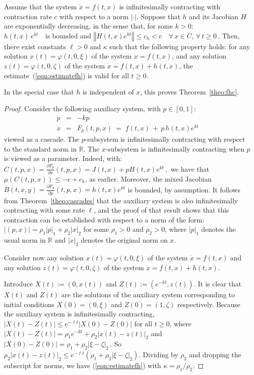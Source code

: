 \documentclass{svmult}
\newcommand{\opteqn}[1]{$#1$}
\newcommand{\R}{{\mathbb R}}  %
\newcommand{\abs}[1]{\left\vert #1 \right\vert}
\newcommand{\norm}[1]{\left\Vert #1 \right\Vert}
\newcommand{\beqn}{\begin{eqnarray*}}
\newcommand{\eeqn}{\end{eqnarray*}}
\newcommand{\cc}{c}
\newcommand{\norma}{1}
\newcommand{\normb}{2}
\newcommand{\absv}[1]{\left\vert #1 \right\vert}
\begin{document}
\begin{lemma}
\label{lem:fh}
Assume that the system $\dot x=f(t,x)$ is infinitesimally contracting with
contraction rate $\cc$ with respect to a norm $\absv{\cdot }$.
Suppose that $h$ and its Jacobian $H$ are exponentially decreasing, in the
sense that, for some $k>0$:
\opteqn{
h(t,x)\,e^{kt} \quad \mbox{is bounded}
}
and
\opteqn{
\norm{H(t,x)e^{kt}} \leq  c_h < c\quad
\forall \,x \in C, \, \forall \, t\geq 0\,.
}
Then, there exist constants $\ell>0$ and $\kappa $ such that the following property
holds:
for any solution $x(t)=\varphi(t,0,\xi )$ of the system $\dot x=f(t,x)$,
and any solution $z(t)=\varphi(t,0,\zeta )$ of the system $\dot x=f(t,x)+h(t,x)$,
the estimate~(\ref{eqn:estimatefh}) is valid for all $t\geq 0$.
\end{lemma}

In the special case that $h$ is independent of $x$, this
proves Theorem~\ref{theo:fhc}.

\begin{proof}
Consider the following auxiliary system, with $p\in [0,1]$:
\beqn
\dot p &=& -kp\\
\dot x &=& F_p(t,p,x) \;=\; f(t,x) \,+\, p\, h(t,x)e^{kt}
\eeqn
viewed as a cascade.
The $p$-subsystem is infinitesimally contracting
with respect to the standard norm in $\R$.
The $x$-subsystem is infinitesimally contracting
when $p$ is viewed as a parameter.  Indeed, with:
\opteqn{
C(t,p,x) = \frac{\partial F_p}{\partial x}(t,p,x) = J(t,x)+ pH(t,x)e^{kt} \,,
}
we have that $\mu (C(t,p,x)) \leq  -c+c_h$, as earlier.
Moreover, the mixed Jacobian
\opteqn{
B(t,x,y) = \frac{\partial F_p}{\partial p}(t,p,x) = h(t,x)e^{kt}
}
is bounded, by assumption.
It follows from Theorem~\ref{theo:cascades} that the auxiliary system is also
infinitesimally contracting with some rate $\ell$, and the proof of that
result shows that this contraction can be established with respect to a norm
of the form: 
$\abs{(p,x)} = \rho _1 \abs{p}_{\norma} + \rho _2 \abs{x}_{\normb}$
for some $\rho _1>0$ and $\rho _2>0$, where $\abs{p}_{\norma}$ denotes the usual
norm in $\R$ and $\abs{x}_{\normb}$ denotes the original norm on $x$.

Consider now any solution $x(t)=\varphi(t,0,\xi )$ of the system $\dot x=f(t,x)$ and any
solution $z(t)=\varphi(t,0,\zeta )$ of the system $\dot x=f(t,x)+h(t,x)$.

Introduce $X(t) := (0,x(t))$ and $Z(t) := (e^{-kt},z(t))$.
It is clear that $X(t)$ and $Z(t)$ are the solutions of the
auxiliary system corresponding to initial conditions
$X(0)=(0,\xi )$ and $Z(0)=(1,\zeta )$ respectively.
Because the auxiliary system is infinitesimally contracting,
\opteqn{
\abs{X(t)-Z(t)}\leq e^{-\ell t}\abs{X(0)-Z(0)}
}
for all $t\geq 0$, where
\opteqn{
\abs{X(t)-Z(t)} = \rho _1 e^{-kt} + \rho _2 \abs{x(t)-z(t)}_{\normb}
}
and
\opteqn{
\abs{X(0)-Z(0)} = \rho _1  + \rho _2 \abs{\xi -\zeta }_{\normb}\,.
}
So
\opteqn{
\rho _2 \abs{x(t)-z(t)}_{\normb} \leq  
e^{-\ell t} \left(\rho _1  + \rho _2 \abs{\xi -\zeta }_{\normb}\right).
}
Dividing by $\rho _2$ and dropping the subscript for norms, we have
(\ref{eqn:estimatefh}) with $\kappa =\rho _1/\rho _2$.
\end{proof}
\end{document}
